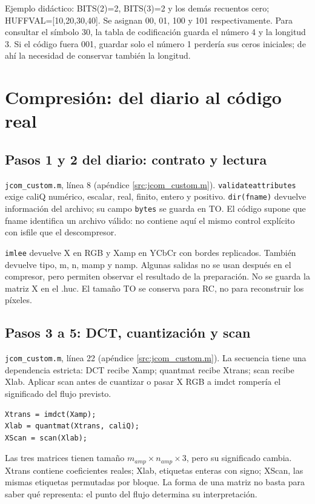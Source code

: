 \documentclass[11pt,a4paper,oneside]{report}
\begin{document}
Ejemplo didáctico: BITS(2)=2, BITS(3)=2 y los demás recuentos cero;
HUFFVAL=[10,20,30,40]. Se asignan 00, 01, 100 y 101 respectivamente.
Para consultar el símbolo 30, la tabla de codificación guarda el número 4
y la longitud 3. Si el código fuera 001, guardar solo el número 1 perdería
sus ceros iniciales; de ahí la necesidad de conservar también la longitud.


\chapter{Compresión: del diario al código real}
\section{Pasos 1 y 2 del diario: contrato y lectura}
\texttt{jcom\_custom.m}, línea 8 (apéndice \ref{src:jcom_custom.m}).
\texttt{validateattributes} exige caliQ numérico, escalar, real, finito, entero
y positivo. \texttt{dir(fname)} devuelve información del archivo; su campo
\texttt{bytes} se guarda en TO. El código supone que fname identifica un archivo
válido: no contiene aquí el mismo control explícito con isfile que el descompresor.

\texttt{imlee} devuelve X en RGB y Xamp en YCbCr con bordes replicados.
También devuelve tipo, m, n, mamp y namp. Algunas salidas no se usan después
en el compresor, pero permiten observar el resultado de la preparación.
No se guarda la matriz X en el .huc. El tamaño TO se conserva para RC,
no para reconstruir los píxeles.


\section{Pasos 3 a 5: DCT, cuantización y scan}
\texttt{jcom\_custom.m}, línea 22 (apéndice \ref{src:jcom_custom.m}).
La secuencia tiene una dependencia estricta: DCT recibe Xamp; quantmat recibe
Xtrans; scan recibe Xlab. Aplicar scan antes de cuantizar o pasar X RGB a imdct
rompería el significado del flujo previsto.


\begin{lstlisting}
Xtrans = imdct(Xamp);
Xlab = quantmat(Xtrans, caliQ);
XScan = scan(Xlab);
\end{lstlisting}


Las tres matrices tienen tamaño $m_{amp}\times n_{amp}\times3$, pero su significado
cambia. Xtrans contiene coeficientes reales; Xlab, etiquetas enteras con signo;
XScan, las mismas etiquetas permutadas por bloque. La forma de una matriz
no basta para saber qué representa: el punto del flujo determina su interpretación.
\end{document}

